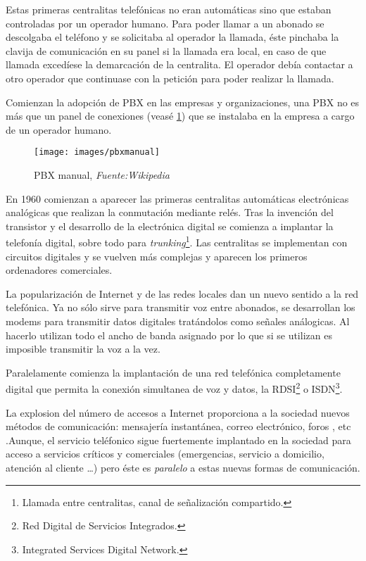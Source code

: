 \documentclass{scrartcl}
\begin{document}
Estas primeras centralitas telefónicas no eran automáticas sino que estaban controladas por un operador humano. Para poder llamar a un abonado se descolgaba el teléfono y se solicitaba al operador la llamada, éste pinchaba la clavija de comunicación en su panel si la llamada era local, en caso de que llamada excedíese la demarcación de la centralita. El operador debía contactar a otro operador que continuase con la petición para poder realizar la llamada.

Comienzan la adopción de PBX en las empresas y organizaciones, una PBX no es más que un panel de conexiones (veasé \ref{fig:pbxmanual}) que se instalaba en la empresa a cargo de un operador humano.

\begin{figure}[!h]
  \centering
  \texttt{[image: images/pbxmanual]}
  \caption{PBX manual, \emph{Fuente:Wikipedia}}
  \label{fig:pbxmanual}
\end{figure}

En 1960 comienzan a aparecer las primeras centralitas automáticas electrónicas analógicas que realizan la conmutación mediante relés. Tras la invención del transistor y el desarrollo de la electrónica digital se comienza a implantar la telefonía digital, sobre todo para \emph{trunking}\footnote{Llamada entre centralitas, canal de señalización compartido.}. Las centralitas se implementan con circuitos digitales y se vuelven más complejas y aparecen los primeros ordenadores comerciales.

La popularización de Internet y de las redes locales dan un nuevo sentido a la red telefónica. Ya no sólo sirve para transmitir voz entre abonados, se desarrollan los modems para transmitir datos digitales tratándolos como señales análogicas. Al hacerlo utilizan todo el ancho de banda asignado por lo que si se utilizan es imposible transmitir la voz a la vez. 

Paralelamente comienza la implantación de una red telefónica completamente digital que permita la conexión simultanea de voz y datos, la RDSI\footnote{Red Digital de Servicios Integrados.} o ISDN\footnote{Integrated Services Digital Network.}. 

La explosion del número de accesos a Internet proporciona a la sociedad nuevos métodos de comunicación: mensajería instantánea, correo electrónico, foros , etc .Aunque, el servicio teléfonico sigue fuertemente implantado en la sociedad para acceso a servicios críticos y comerciales (emergencias, servicio a domicilio, atención al cliente \ldots) pero éste es \emph{paralelo} a estas nuevas formas de comunicación.
\end{document}

